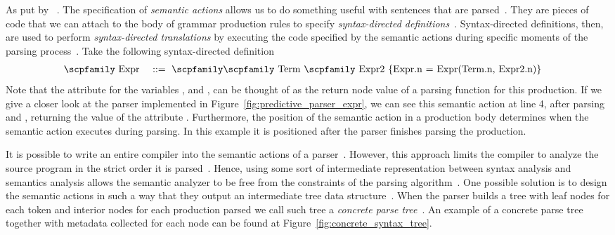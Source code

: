 \documentclass[
  oneside,
  english,
  coorientadorbanca,
  noabntexcite
]{ufsc-thesis-rn46-2019}
\def\bnfdef{::=}
\newcommand{\codett}[1]{\text{\scpfamily#1}}
\newcommand{\code}[1]{\text{\scpfamily\setlength\spaceskip{0.35em}#1}}
\newcommand{\bnfvar}[1]{\codett{#1}}
\newcommand{\bnfprod}[2]{\bnfvar{#1} & \ & \bnfdef{} & \ \code{#2}}
\begin{document}
As put by~\textcite{appel2003modern} .
The specification of \textit{semantic actions} allows us to do something useful with sentences that are parsed~\cite{appel2003modern}.
They are pieces of code that we can attach to the body of grammar production rules to specify \textit{syntax-directed definitions}~\cite{Aho:2006:CPT:1177220}.
Syntax-directed definitions, then, are used to perform \textit{syntax-directed translations} by executing the code specified by the semantic actions during specific moments of the parsing process~\cite{Aho:2006:CPT:1177220}.
Take the following syntax-directed definition
\begin{alignat}{2}
  \bnfprod{Expr}{\bnfvar{Term} \bnfvar{Expr2} \{Expr.n = Expr(Term.n, Expr2.n)\}} \label{eq:sdd_example}
\end{alignat}
Note that the attribute \codett{n} for the variables \bnfvar{Expr}, \bnfvar{Term} and \bnfvar{Expr2}, can be thought of as the return node value of a parsing function for this production.
If we give a closer look at the parser implemented in Figure~\ref{fig:predictive_parser_expr}, we can see this semantic action at line 4, after parsing \bnfvar{Term} and \bnfvar{Expr2}, returning the value of the attribute \codett{Expr.n}.
Furthermore, the position of the semantic action in a production body determines when the semantic action executes during parsing.
In this example it is positioned after the parser finishes parsing the production.

It is possible to write an entire compiler into the semantic actions of a parser~\cite{appel2003modern}.
However, this approach limits the compiler to analyze the source program in the strict order it is parsed~\cite{appel2003modern}.
Hence, using some sort of intermediate representation between syntax analysis and semantics analysis allows the semantic analyzer to be free from the constraints of the parsing algorithm~\cite{appel2003modern}.
One possible solution is to design the semantic actions in such a way that they output an intermediate tree data structure~\cite{appel2003modern}.
When the parser builds a tree with leaf nodes for each token and interior nodes for each production parsed we call such tree a \textit{concrete parse tree}~\cite{appel2003modern}.
An example of a concrete parse tree together with metadata collected for each node can be found at Figure~\ref{fig:concrete_syntax_tree}.
\end{document}
